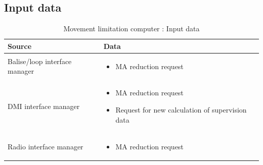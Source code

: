 \documentclass[nocc]{template/openetcs_report}
\begin{document}
\subsection{Input data}
			\begin{longtable}{|l|l|}
				\caption{Movement limitation computer : Input data}\\ 
				\hline
				
					\begin{minipage}[t]{0.35\linewidth} \textbf{Source}	\end{minipage} 
				&	\begin{minipage}[t]{0.65\linewidth} \textbf{Data} \end{minipage} \\
				
				\hline
																																									
					\begin{minipage}[t]{0.35\linewidth} Balise/loop interface manager	\end{minipage} 
				&	\begin{minipage}[t]{0.65\linewidth}
						\begin{itemize}
							\item MA reduction request
						\end{itemize}
					\end{minipage} \\
				
				\hline
				
					\begin{minipage}[t]{0.35\linewidth} DMI interface manager	\end{minipage} 
				&	\begin{minipage}[t]{0.65\linewidth}
						\begin{itemize}
							\item MA reduction request 
							\item Request for new calculation of supervision data
						\end{itemize}			
					\end{minipage} \\
				
				\hline
				
					\begin{minipage}[t]{0.35\linewidth} Radio interface manager	\end{minipage} 
				&	\begin{minipage}[t]{0.65\linewidth}
						\begin{itemize}
							\item MA reduction request
						\end{itemize}			
					\end{minipage} \\
				

\end{longtable}
\end{document}
